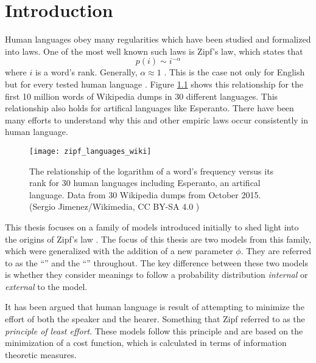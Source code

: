 \chapter{Introduction}
\label{cha:introduction}

Human languages obey many regularities which have been studied and formalized into laws.
One of the most well known such laws is Zipf's law, which states that
\begin{equation}
  \label{eq:zipf_law}
  p(i) \sim i^{-\alpha}
\end{equation}
where $i$ is a word's rank.
Generally, $\alpha \approx 1$ \cite{Zipf1949a}.
This is the case not only for English but for every tested human language \cite{Mehri2017}.
Figure \ref{fig:zipf_languages_wiki} shows this relationship for the first 10 million words of Wikipedia dumps in 30 different languages.
This relationship also holds for artifical languages like Esperanto.
There have been many efforts to understand why this and other empiric laws occur consistently in human language.

\begin{figure}
  \centering
  \texttt{[image: zipf\_languages\_wiki]}
  \caption{
    The relationship of the logarithm of a word's frequency versus its rank for 30 human languages including Esperanto, an artifical language.
    Data from 30 Wikipedia dumps from October 2015.\\
    (Sergio Jimenez/Wikimedia, CC BY-SA 4.0 \cite{Jimenez2015a})}
  \label{fig:zipf_languages_wiki}
\end{figure}

This thesis focuses on a family of models \cite{Ferrer2007a} introduced initially to shed light into the origins of Zipf's law \cite{Ferrer2005a} \cite{Ferrer2003a}.
The focus of this thesis are two models from this family, which were generalized with the addition of a new parameter $\phi$. \cite{Ferrer2018a}
They are referred to as the ``\firstmodel{}'' and the ``\secondmodel{}'' throughout.
The key difference between these two models is whether they consider meanings to follow a probability distribution \emph{internal} or \emph{external} to the model.

It has been argued \cite{Ferrer2003a} \cite{Zipf1949a} that human language is result of attempting to minimize the effort of both the speaker and the hearer. Something that Zipf referred to as the \emph{principle of least effort}. These models follow this principle and are based on the minimization of a cost function, which is calculated in terms of information theoretic measures.

